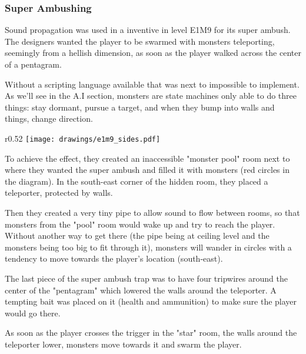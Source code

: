 \subsubsection{Super Ambushing}
Sound propagation was used in a inventive in level E1M9 for its super ambush.  The designers wanted the player to be swarmed with monsters teleporting, seemingly from a hellish dimension, as soon as the player walked across the center of a pentagram.\\
\par
 Without a scripting language available that was next to impossible to implement. As we'll see in the A.I section, monsters are state machines only able to do three things: stay dormant, pursue a target, and when they bump into walls and things, change direction.\\
\par
\begin{wrapfigure}[24]{r}{0.52\textwidth}
\centering
\texttt{[image: drawings/e1m9\_sides.pdf]}
\end{wrapfigure}

\par

To achieve the effect, they created an inaccessible "monster pool" room next to where they wanted the super ambush and filled it with monsters (red circles in the diagram). In the south-east corner of the hidden room, they placed a teleporter, protected by walls.\\
\par
Then they created a very tiny pipe to allow sound to flow between rooms, so that monsters from the "pool" room would wake up and try to reach the player. Without another way to get there (the pipe being at ceiling level and the monsters being too big to fit through it), monsters will wander in circles with a tendency to move towards the player's location (south-east).\\
\par
The last piece of the super ambush trap was to have four tripwires around the center of the "pentagram" which lowered the walls around the teleporter. A tempting bait was placed on it (health and ammunition) to make sure the player would go there.\\
\par

As soon as the player crosses the trigger in the "star" room, the walls around the teleporter lower, monsters move towards it and swarm the player. \\
\par
{}







